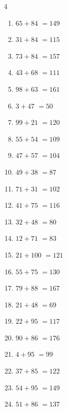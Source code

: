\begin{multicols}{4}
\begin{enumerate}
  \item $65+84$
        $=149$

  \item $31+84$
        $=115$

  \item $73+84$
        $=157$

  \item $43+68$
        $=111$

  \item $98+63$
        $=161$

  \item $3+47$
        $=50$

  \item $99+21$
        $=120$

  \item $55+54$
        $=109$

  \item $47+57$
        $=104$

  \item $49+38$
        $=87$

  \item $71+31$
        $=102$

  \item $41+75$
        $=116$

  \item $32+48$
        $=80$

  \item $12+71$
        $=83$

  \item $21+100$
        $=121$

  \item $55+75$
        $=130$

  \item $79+88$
        $=167$

  \item $21+48$
        $=69$

  \item $22+95$
        $=117$

  \item $90+86$
        $=176$

  \item $4+95$
        $=99$

  \item $37+85$
        $=122$

  \item $54+95$
        $=149$

  \item $51+86$
        $=137$


\end{enumerate}
\end{multicols}
